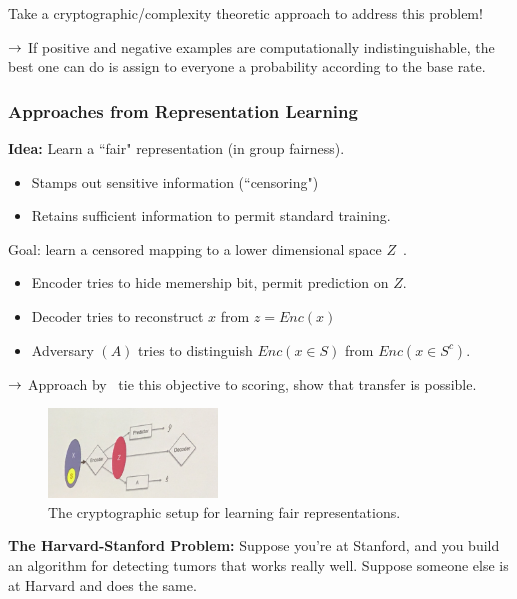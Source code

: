 Take a cryptographic/complexity theoretic approach to address this problem!

$\rightarrow$ If positive and negative examples are computationally indistinguishable, the best one can do is assign to everyone a probability according to the base rate.

\subsubsection{Approaches from Representation Learning}

{\bf Idea:} Learn a ``fair" representation (in group fairness).
\begin{itemize}
    \item Stamps out sensitive information (``censoring")
    \item Retains sufficient information to permit standard training.
\end{itemize}

Goal: learn a censored mapping to a lower dimensional space $Z$~\cite{edwards2015censoring}.
\begin{itemize}
    \item Encoder tries to hide memership bit, permit prediction on $Z$.
    \item Decoder tries to reconstruct $x$ from $z = Enc(x)$
    \item Adversary $(A)$ tries to distinguish $Enc(x \in S)$ from $Enc(x \in S^c)$.
\end{itemize}

$\rightarrow$ Approach by~\citet{madras2018learning} tie this objective to scoring, show that transfer is possible. \\

\begin{figure}[h!]
    \centering
    \includegraphics[width=0.4\textwidth]{images/code_rep.png}
    \caption{The cryptographic setup for learning fair representations.}
    \label{fig:my_label}
\end{figure}

{\bf The Harvard-Stanford Problem:} Suppose you're at Stanford, and you build an algorithm for detecting tumors that works really well. Suppose someone else is at Harvard and does the same. \\

